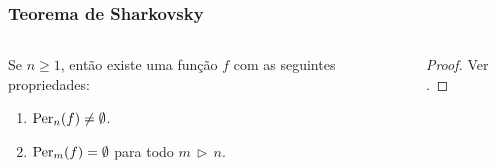 \begin{frame}
\vspace{5pt}
\frametitle{Teorema de Sharkovsky}
\begin{columns}
\column{\dimexpr\paperwidth-15pt}

\begin{theorem}
Se $n \geq 1$, então existe uma função $f$ com as seguintes propriedades:
\begin{enumerate}
\item $\operatorname{Per}_n(f) \neq \emptyset$.
\item $\operatorname{Per}_m(f) =  \emptyset$ para todo $m \, \triangleright \, n$.
\end{enumerate}
\end{theorem}

\begin{proof}
Ver \cite{burns}.
\end{proof}

\end{columns}
\end{frame}
